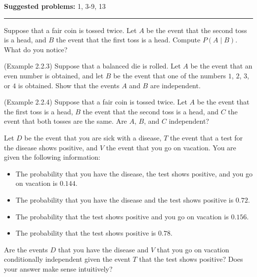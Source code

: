 \documentclass[12pt,reqno]{amsart}
\begin{document}
\textbf{Suggested problems:} 1, 3-9, 13

\bigskip
\hrule

\bigskip

\prob Suppose that a fair coin is tossed twice. Let $A$ be the event that the second toss is a head, and $B$ the event that the first toss is a head. Compute $P(A\mid B)$. What do you notice?

\vfill
\prob (Example 2.2.3) Suppose that a balanced die is rolled. Let $A$ be the event that an even number is obtained, and let $B$ be the event that one of the numbers $1$, $2$, $3$, or $4$ is obtained. Show that the events $A$ and $B$ are independent.

\vfill
\newpage
\prob (Example 2.2.4) Suppose that a fair coin is tossed twice. Let $A$ be the event that the first toss is a head, $B$ the event that the second toss is a head, and $C$ the event that both tosses are the same. Are $A$, $B$, and $C$ independent?

\vfill
\prob Let $D$ be the event that you are sick with a disease, $T$ the event that a test for the disease shows positive, and $V$ the event that you go on vacation. You are given the following information:

\medskip
\begin{itemize}
\item The probability that you have the disease, the test shows positive, and you go on vacation is $0.144$.
\item The probability that you have the disease and the test shows positive is $0.72$.
\item The probability that the test shows positive and you go on vacation is $0.156$.
\item The probability that the test shows positive is $0.78$.
\end{itemize}

Are the events $D$ that you have the disease and $V$ that you go on vacation conditionally independent given the event $T$ that the test shows positive? Does your answer make sense intuitively?

\vfill
\end{document}
